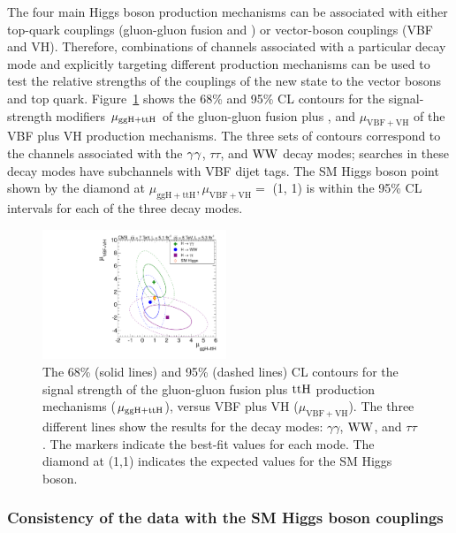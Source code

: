 \documentclass[12pt,twoside,a4paper,cmspaper,final,collab]{cms-tdr}
\begin{document}
The four main Higgs boson production mechanisms can be associated with either top-quark
couplings (gluon-gluon fusion and \cPqt\cPqt\PH) or vector-boson couplings (VBF and VH).
Therefore, combinations of channels associated with a particular decay mode
and explicitly targeting different production mechanisms
can be used to test the relative strengths of the couplings of the new state to the vector bosons and top quark.
Figure~\ref{fig:rvrf} shows the 68\% and 95\% CL contours for the signal-strength modifiers $\mu_{\mathrm{g}\mathrm{g}\mathrm{H}+\mathrm{t}\mathrm{t}\mathrm{H}}$  of
the gluon-gluon fusion plus \cPqt\cPqt\PH, and $\mu_{\mathrm{VBF+VH}}$ of the VBF plus VH production mechanisms.
The three sets of contours correspond to
the channels associated with the $\gamma\gamma$, $\tau\tau$, and $\mathrm{W}\mathrm{W}$
decay modes; searches in these decay modes have subchannels with VBF dijet tags.
The SM Higgs boson point shown by the diamond at $\mu_{\mathrm{ggH}+\mathrm{ttH}},\mu_{\mathrm{VBF+VH}}=$ (1, 1)
is within the 95\% CL intervals for each of the three decay modes.

\begin{figure}[bhtp]
\centering
\includegraphics[width=0.49\textwidth]{figures/comb/sqr_rvrf_scan_2d_all_68_legSM}
\caption{
The 68\% (solid lines) and 95\% (dashed lines) CL contours for the
signal strength of the gluon-gluon fusion plus $\mathrm{t}\mathrm{t}\mathrm{H}$  production mechanisms ($\mu_{\mathrm{g}\mathrm{g}\mathrm{H}+\mathrm{t}\mathrm{t}\mathrm{H}}$), versus
VBF plus VH ($\mu_{\mathrm{VBF+VH}}$).
 The three different lines show the results for the decay modes: $\gamma\gamma$, $\mathrm{W}\mathrm{W}$,
and $\tau\tau$. The markers indicate the best-fit values for each mode. The diamond
at (1,1) indicates the expected values for the SM Higgs boson.
}
\label{fig:rvrf}
\end{figure}




\subsubsection{Consistency of the data with the SM Higgs boson couplings}
\end{document}
